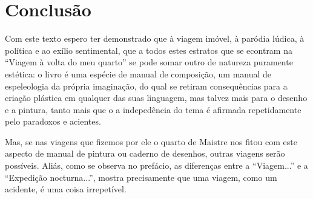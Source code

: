 \documentclass[12pt]{article}
\begin{document}
\section{Conclusão}

Com este texto espero ter demonstrado que à viagem imóvel, à paródia
lúdica, à política e ao exílio sentimental, que a todos estes estratos
que se econtram na ``Viagem à volta do meu quarto'' se pode somar
outro de natureza puramente estética: o livro é uma espécie de manual
de composição, um manual de espeleologia da própria imaginação, do
qual se retiram consequências para a criação plástica em qualquer das
suas linguagem, mas talvez mais para o desenho e a pintura, tanto mais
que o a indepedência do tema é afirmada repetidamente pelo paradoxos e
acientes.

Mas, se nas viagens que fizemos por ele o quarto de Maistre nos fitou
com este aspecto de manual de pintura ou caderno de desenhos, outras
viagens serão possíveis. Aliás, como se observa no prefácio, as
diferenças entre a ``Viagem...'' e a ``Expedição nocturna...'', mostra
precisamente que uma viagem, como um acidente, é uma coisa
irrepetível.

\printbibliography[heading=bibliography,title={Bibliografia}]
\end{document}
